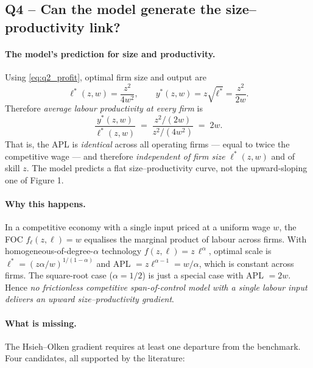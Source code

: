 \documentclass[11pt,a4paper]{article}
\begin{document}
\subsection*{Q4 -- Can the model generate the size--productivity link?}

\paragraph{The model's prediction for size and productivity.}
Using \eqref{eq:q2_profit}, optimal firm size and output are
\[
\ell^{*}(z,w)=\frac{z^{2}}{4w^{2}},\qquad y^{*}(z,w)=z\sqrt{\ell^{*}}=\frac{z^{2}}{2w}.
\]
Therefore \emph{average labour productivity at every firm} is
\begin{equation}
\boxed{\;\frac{y^{*}(z,w)}{\ell^{*}(z,w)}\;=\;\frac{z^{2}/(2w)}{z^{2}/(4w^{2})}\;=\;2w.\;}
\label{eq:q4_APL}
\end{equation}
That is, the APL is \emph{identical} across all operating firms --- equal to twice the competitive wage --- and therefore \emph{independent of firm size} $\ell^{*}(z,w)$ and of skill $z$. The model predicts a flat size--productivity curve, not the upward-sloping one of Figure 1.

\paragraph{Why this happens.}
In a competitive economy with a single input priced at a uniform wage $w$, the FOC $f_{\ell}(z,\ell)=w$ equalises the marginal product of labour across firms. With homogeneous-of-degree-$\alpha$ technology $f(z,\ell)=z\,\ell^{\alpha}$, optimal scale is $\ell^{*}=(z\alpha/w)^{1/(1-\alpha)}$ and APL $=z\ell^{\alpha-1}=w/\alpha$, which is constant across firms. The square-root case ($\alpha=1/2$) is just a special case with APL $=2w$. Hence \emph{no frictionless competitive span-of-control model with a single labour input delivers an upward size--productivity gradient}.

\paragraph{What is missing.}
The Hsieh--Olken gradient requires at least one departure from the benchmark. Four candidates, all supported by the literature:
\end{document}
